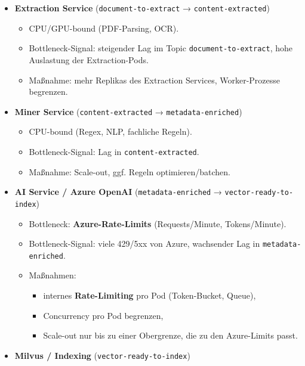 \begin{itemize}
\tightlist
\item
  \textbf{Extraction Service} (\texttt{document-to-extract} →
  \texttt{content-extracted})

  \begin{itemize}
  \tightlist
  \item
    CPU/GPU-bound (PDF-Parsing, OCR).\\
  \item
    Bottleneck-Signal: steigender Lag im Topic
    \texttt{document-to-extract}, hohe Auslastung der Extraction-Pods.\\
  \item
    Maßnahme: mehr Replikas des Extraction Services, Worker-Prozesse
    begrenzen.
  \end{itemize}
\item
  \textbf{Miner Service} (\texttt{content-extracted} →
  \texttt{metadata-enriched})

  \begin{itemize}
  \tightlist
  \item
    CPU-bound (Regex, NLP, fachliche Regeln).\\
  \item
    Bottleneck-Signal: Lag in \texttt{content-extracted}.\\
  \item
    Maßnahme: Scale-out, ggf. Regeln optimieren/batchen.
  \end{itemize}
\item
  \textbf{AI Service / Azure OpenAI} (\texttt{metadata-enriched} →
  \texttt{vector-ready-to-index})

  \begin{itemize}
  \tightlist
  \item
    Bottleneck: \textbf{Azure-Rate-Limits} (Requests/Minute,
    Tokens/Minute).\\
  \item
    Bottleneck-Signal: viele 429/5xx von Azure, wachsender Lag in
    \texttt{metadata-enriched}.\\
  \item
    Maßnahmen:

    \begin{itemize}
    \tightlist
    \item
      internes \textbf{Rate-Limiting} pro Pod (Token-Bucket, Queue),
    \item
      Concurrency pro Pod begrenzen,
    \item
      Scale-out nur bis zu einer Obergrenze, die zu den Azure-Limits
      passt.
    \end{itemize}
  \end{itemize}
\item
  \textbf{Milvus / Indexing} (\texttt{vector-ready-to-index})


\end{itemize}
